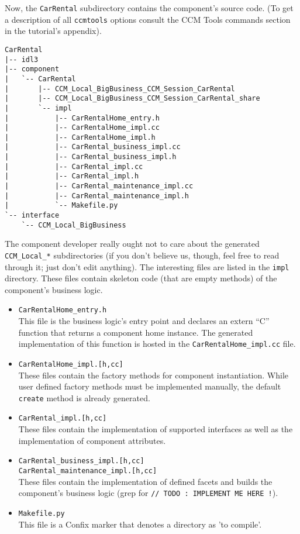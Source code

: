 Now, the {\tt CarRental} subdirectory contains the component's source code. 
(To get a description of all {\tt ccmtools} options consult the 
CCM Tools commands section in the tutorial's appendix).
\begin{small}
\begin{verbatim}
CarRental
|-- idl3
|-- component
|   `-- CarRental
|       |-- CCM_Local_BigBusiness_CCM_Session_CarRental
|       |-- CCM_Local_BigBusiness_CCM_Session_CarRental_share
|       `-- impl
|           |-- CarRentalHome_entry.h
|           |-- CarRentalHome_impl.cc
|           |-- CarRentalHome_impl.h
|           |-- CarRental_business_impl.cc
|           |-- CarRental_business_impl.h
|           |-- CarRental_impl.cc
|           |-- CarRental_impl.h
|           |-- CarRental_maintenance_impl.cc
|           |-- CarRental_maintenance_impl.h
|           `-- Makefile.py
`-- interface
    `-- CCM_Local_BigBusiness
\end{verbatim}
\end{small}

The component developer really ought not to care about the generated 
{\tt CCM\_Local\_*} subdirectories (if you don't believe us, though, feel free 
to read through it; just don't edit anything). 
The interesting files are listed in the {\tt impl} directory. 
These files contain skeleton code (that are empty methods) of the component's 
business logic.

\begin{itemize}
\item {\tt CarRentalHome\_entry.h} \\
This file is the business logic's entry point and declares an extern ``C'' 
function that returns a component home instance.
The generated implementation of this function is hosted in the 
{\tt CarRentalHome\_impl.cc} file.

\item {\tt CarRentalHome\_impl.[h,cc]} \\
These files contain the factory methods for component instantiation. 
While user defined factory methods must be implemented manually, the default 
{\tt create} method is already generated.

\item {\tt CarRental\_impl.[h,cc]} \\
These files contain the implementation of supported interfaces as well as the
implementation of component attributes.

\item {\tt CarRental\_business\_impl.[h,cc]} \\
{\tt CarRental\_maintenance\_impl.[h,cc]} \\
These files contain the implementation of defined facets and builds
the component's business logic
(grep for {\tt // TODO : IMPLEMENT ME HERE !}).

\item {\tt Makefile.py} \\
This file is a Confix marker that denotes a directory as 'to compile'.
\end{itemize}

